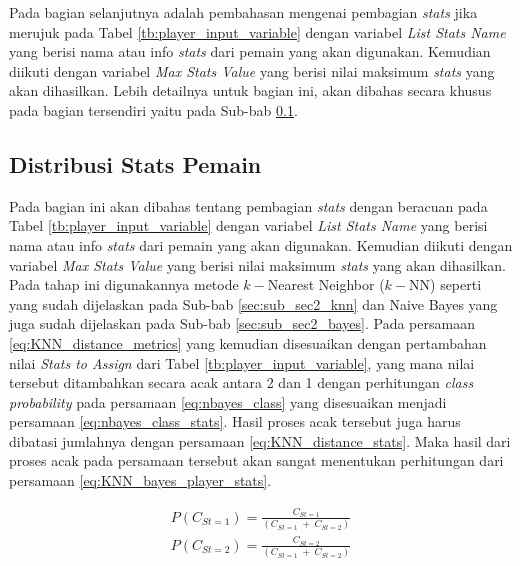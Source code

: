 Pada bagian selanjutnya adalah pembahasan mengenai pembagian \textit{stats} jika merujuk pada Tabel \ref{tb:player_input_variable} dengan variabel \textit{List Stats Name} yang berisi nama atau info \textit{stats} dari pemain yang akan digunakan. Kemudian diikuti dengan variabel \textit{Max Stats Value} yang berisi nilai maksimum \textit{stats} yang akan dihasilkan. Lebih detailnya untuk bagian ini, akan dibahas secara khusus pada bagian tersendiri yaitu pada Sub-bab \ref{sec:sub_sec3_stat_pemain}.
\vspace{1ex}

\subsection{Distribusi Stats Pemain}
\label{sec:sub_sec3_stat_pemain}
\vspace{1ex}

Pada bagian ini akan dibahas tentang pembagian \textit{stats} dengan beracuan pada Tabel \ref{tb:player_input_variable} dengan variabel \textit{List Stats Name} yang berisi nama atau info \textit{stats} dari pemain yang akan digunakan. Kemudian diikuti dengan variabel \textit{Max Stats Value} yang berisi nilai maksimum \textit{stats} yang akan dihasilkan. Pada tahap ini digunakannya metode $k-$Nearest Neighbor ($k-$NN) seperti yang sudah dijelaskan pada Sub-bab \ref{sec:sub_sec2_knn} dan Naive Bayes yang juga sudah dijelaskan pada Sub-bab \ref{sec:sub_sec2_bayes}. Pada persamaan \ref{eq:KNN_distance_metrics} yang kemudian disesuaikan dengan pertambahan nilai \textit{Stats to Assign} dari Tabel \ref{tb:player_input_variable}, yang mana nilai tersebut ditambahkan secara acak antara 2 dan 1 dengan perhitungan \textit{class probability} pada persamaan \ref{eq:nbayes_class} yang disesuaikan menjadi persamaan \ref{eq:nbayes_class_stats}. Hasil proses acak tersebut juga harus dibatasi jumlahnya dengan persamaan \ref{eq:KNN_distance_stats}. Maka hasil dari proses acak pada persamaan tersebut akan sangat menentukan perhitungan dari persamaan \ref{eq:KNN_bayes_player_stats}.

\begin{equation}\label{eq:nbayes_class_stats}
\begin{split}
P(C_{St = 1}) = \frac{C_{St = 1}}{(C_{St = 1}\ +\ C_{St = 2})} \\
P(C_{St = 2}) = \frac{C_{St = 2}}{(C_{St = 1}\ +\ C_{St = 2})}
\end{split}
\end{equation}

